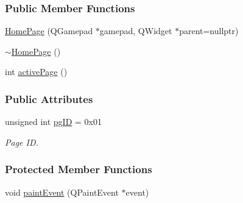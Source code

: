 \subsubsection*{Public Member Functions}
\begin{DoxyCompactItemize}
\item 
\mbox{\hyperlink{classHomePage_a5a47924673356c09cc9269511e07fdf2}{Home\+Page}} (Q\+Gamepad $\ast$gamepad, Q\+Widget $\ast$parent=nullptr)
\item 
\mbox{\hyperlink{classHomePage_aff8e741021104752949c6935c7407f90}{$\sim$\+Home\+Page}} ()
\item 
int \mbox{\hyperlink{classHomePage_a0b6a91525a77e5ea66505666f7ba7c8d}{active\+Page}} ()
\end{DoxyCompactItemize}
\subsubsection*{Public Attributes}
\begin{DoxyCompactItemize}
\item 
unsigned int \mbox{\hyperlink{classHomePage_ac9959d1707d1b0a4dcbcff018a46b2a9}{pg\+ID}} = 0x01
\begin{DoxyCompactList}\small\item\em Page ID. \end{DoxyCompactList}\end{DoxyCompactItemize}
\subsubsection*{Protected Member Functions}
\begin{DoxyCompactItemize}
\item 
void \mbox{\hyperlink{classHomePage_ab3daab17f753e46efcec8968333f88b5}{paint\+Event}} (Q\+Paint\+Event $\ast$event)
\end{DoxyCompactItemize}
